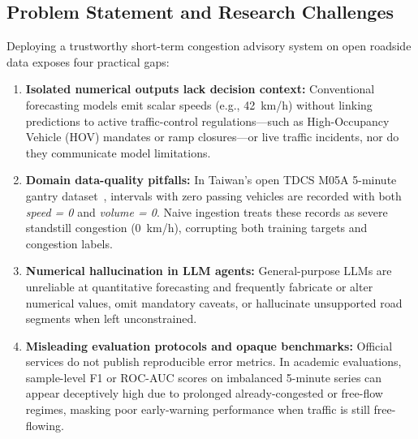 \subsection{Problem Statement and Research Challenges}
Deploying a trustworthy short-term congestion advisory system on open roadside data exposes four practical gaps:
\begin{enumerate}
    \item \textbf{Isolated numerical outputs lack decision context:} Conventional forecasting models emit scalar speeds (e.g., 42~km/h) without linking predictions to active traffic-control regulations---such as High-Occupancy Vehicle (HOV) mandates or ramp closures---or live traffic incidents, nor do they communicate model limitations.
    \item \textbf{Domain data-quality pitfalls:} In Taiwan's open TDCS M05A 5-minute gantry dataset~\cite{tdcs_m05a}, intervals with zero passing vehicles are recorded with both \textit{speed = 0} and \textit{volume = 0}. Naive ingestion treats these records as severe standstill congestion (0~km/h), corrupting both training targets and congestion labels.
    \item \textbf{Numerical hallucination in LLM agents:} General-purpose LLMs are unreliable at quantitative forecasting and frequently fabricate or alter numerical values, omit mandatory caveats, or hallucinate unsupported road segments when left unconstrained.
    \item \textbf{Misleading evaluation protocols and opaque benchmarks:} Official services do not publish reproducible error metrics. In academic evaluations, sample-level F1 or ROC-AUC scores on imbalanced 5-minute series can appear deceptively high due to prolonged already-congested or free-flow regimes, masking poor early-warning performance when traffic is still free-flowing.
\end{enumerate}

